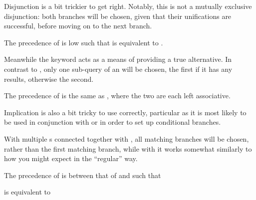 Disjunction is a bit trickier to get right. Notably, this is not a mutually
exclusive disjunction: both branches will be chosen, given that their unifications
are successful, before moving on to the next branch.

The precedence of  is low such that 
is equivalent to .

\begin{prooftree}
\end{prooftree}

\begin{prooftree}
\end{prooftree}

Meanwhile the  keyword acts as a means of providing a true alternative.
In contrast to , only one sub-query of an  will be chosen, the
first if it has any results, otherwise the second.

The precedence of  is the same as , where the two are each left
associative.

\begin{prooftree}
\end{prooftree}

\begin{prooftree}
\end{prooftree}

Implication is also a bit tricky to use correctly, particular as it is most likely
to be used in conjunction with  or  in order to set up conditional
branches.

With multiple s connected together with , all matching branches will
be chosen, rather than the first matching branch, while with  it works
somewhat similarly to how you might expect in the ``regular'' way.

The precedence of  is between that of  and  such that

\begin{center}
\end{center}

is equivalent to

\begin{center}
\end{center}
